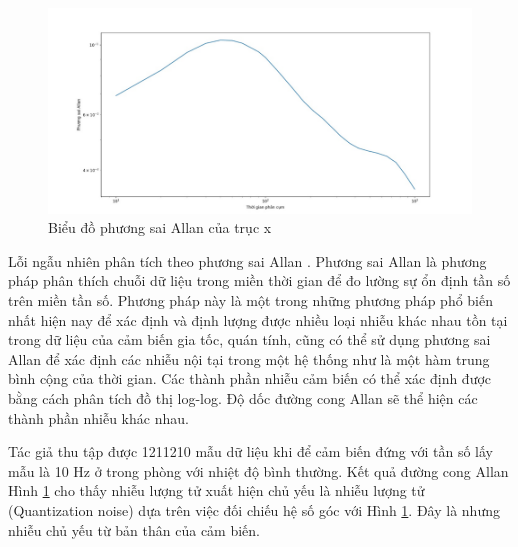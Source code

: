 \begin{figure}[!]
		\centering
 		\includegraphics[width=1\textwidth]{images/allan_real.png}
		\caption{Biểu đồ phương sai Allan của trục x}
		\label{allan_real}
\end{figure}

Lỗi ngẫu nhiên phân tích theo phương sai Allan \cite{allan}. Phương sai Allan là phương pháp phân thích chuỗi dữ liệu trong miền thời gian để đo lường sự ổn định tần số trên miền tần số. Phương pháp này là một trong những phương pháp phổ biến nhất hiện nay để xác định và định lượng được nhiều loại nhiễu khác nhau tồn tại trong dữ liệu của cảm biến gia tốc, quán tính, cũng có thể sử dụng phương sai Allan để xác định các nhiễu nội tại trong một hệ thống như là một hàm trung bình cộng của thời gian. Các thành phần nhiễu cảm biến có thể xác định được bằng cách phân tích đồ thị log-log. Độ dốc đường cong Allan sẽ thể hiện các thành phần nhiễu khác nhau.

Tác giả thu tập được 1211210 mẫu dữ liệu khi để cảm biến đứng với tần số lấy mẫu là 10 Hz ở trong phòng với nhiệt độ bình thường. Kết quả đường cong Allan Hình \ref{allan_real} cho thấy nhiễu lượng tử xuất hiện chủ yếu là nhiễu lượng tử (Quantization noise) dựa trên việc đối chiếu hệ số góc với Hình \ref{allan_real}. Đây là nhưng nhiễu chủ yếu từ bản thân của cảm biến.



